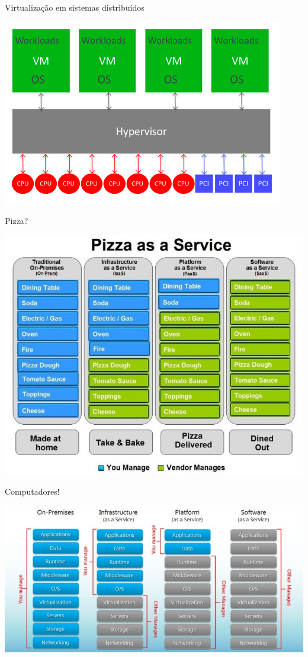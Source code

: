 \documentclass[compress]{beamer}
\begin{document}
\begin{frame}{Virtualização em sistemas distribuídos}

\centering \includegraphics[width=\textwidth]{images/iaas.png}

\end{frame}


\begin{frame}{Pizza?}

\centering \includegraphics[width=\textwidth]{images/virtualizacao_pizza.jpg}

\end{frame}


\begin{frame}{Computadores!}

\centering \includegraphics[width=\textwidth]{images/virtualizacao_comparacao.jpg}

\end{frame}
\end{document}
